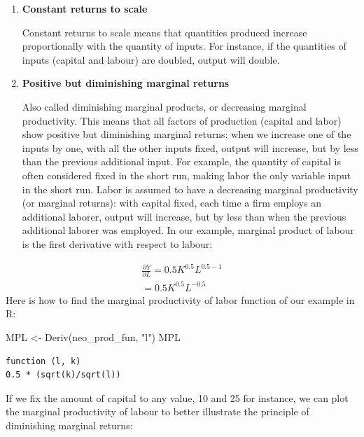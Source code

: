 \documentclass[
  letterpaper,
  DIV=11,
  numbers=noendperiod]{scrreprt}
\newenvironment{Shaded}{\begin{snugshade}}{\end{snugshade}}
\newcommand{\FunctionTok}[1]{\textcolor[rgb]{0.28,0.35,0.67}{#1}}
\newcommand{\NormalTok}[1]{\textcolor[rgb]{0.00,0.23,0.31}{#1}}
\newcommand{\OtherTok}[1]{\textcolor[rgb]{0.00,0.23,0.31}{#1}}
\newcommand{\StringTok}[1]{\textcolor[rgb]{0.13,0.47,0.30}{#1}}
\begin{document}
\begin{enumerate}
\def\labelenumi{\arabic{enumi}.}
\item
  \textbf{Constant returns to scale}

  Constant returns to scale means that quantities produced increase
  proportionally with the quantity of inputs. For instance, if the
  quantities of inputs (capital and labour) are doubled, output will
  double.
\item
  \textbf{Positive but diminishing marginal returns}

  Also called diminishing marginal products, or decreasing marginal
  productivity. This means that all factors of production (capital and
  labor) show positive but diminishing marginal returns: when we
  increase one of the inputs by one, with all the other inputs fixed,
  output will increase, but by less than the previous additional input.
  For example, the quantity of capital is often considered fixed in the
  short run, making labor the only variable input in the short run.
  Labor is assumed to have a decreasing marginal productivity (or
  marginal returns): with capital fixed, each time a firm employs an
  additional laborer, output will increase, but by less than when the
  previous additional laborer was employed. In our example, marginal
  product of labour is the first derivative with respect to labour:
\end{enumerate}

\[
\begin{aligned}
\frac{\partial{Y}}{\partial{L}} = 0.5K^{0.5}L^{0.5-1}
\\
= 0.5K^{0.5}L^{-0.5}
\end{aligned}
\] Here is how to find the marginal productivity of labor function of
our example in R:

\begin{Shaded}
\begin{Highlighting}[]
\NormalTok{MPL }\OtherTok{\textless{}{-}} \FunctionTok{Deriv}\NormalTok{(neo\_prod\_fun, }\StringTok{"l"}\NormalTok{)}
\NormalTok{MPL}
\end{Highlighting}
\end{Shaded}

\begin{verbatim}
function (l, k) 
0.5 * (sqrt(k)/sqrt(l))
\end{verbatim}

If we fix the amount of capital to any value, 10 and 25 for instance, we
can plot the marginal productivity of labour to better illustrate the
principle of diminishing marginal returns:
\end{document}
